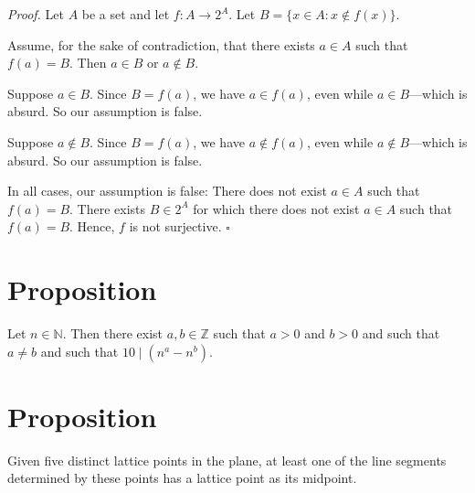 \documentclass[12pt]{article}
\begin{document}
\noindent\textit{Proof. } Let $A$ be a set and let $f:A\to 2^A$. Let $B=\{x\in A:x\notin f(x)\}$.\newline

\noindent Assume, for the sake of contradiction, that there exists $a\in A$ such that $f(a)=B$. Then $a\in B$ or $a\notin B$.\newline

\noindent Suppose $a\in B$. Since $B=f(a)$, we have $a\in f(a)$, even while $a\in B$---which is absurd. So our assumption is false.\newline

\noindent Suppose $a\notin B$. Since $B=f(a)$, we have $a\notin f(a)$, even while $a\notin B$---which is absurd. So our assumption is false.\newline

\noindent In all cases, our assumption is false: There does not exist $a\in A$ such that $f(a)=B$. There exists $B\in 2^A$ for which there does not exist $a\in A$ such that $f(a)=B$. Hence, $f$ is not surjective. $\square$
\section*{Proposition}
Let $n\in\mathbb{N}$. Then there exist $a,b\in\mathbb{Z}$ such that $a>0$ and $b>0$ and such that $a\neq b$ and such that $10\mid\left(n^a-n^b\right)$.
\section*{Proposition}
Given five distinct lattice points in the plane, at least one of the line segments determined by these points has a lattice point as its midpoint.
\end{document}
